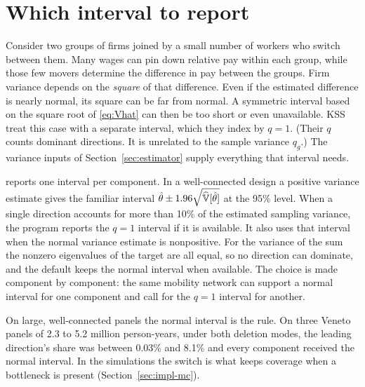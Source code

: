 \section{Which interval to report}\label{sec:q1}\label{sec:impl}

Consider two groups of firms joined by a small number of workers who switch
between them. Many wages can pin down relative pay within each group, while
those few movers determine the difference in pay between the groups. Firm
variance depends on the \emph{square} of that difference. Even if the estimated
difference is nearly normal, its square can be far from normal. A symmetric
interval based on the square root of \eqref{eq:Vhat} can then be too short or
even unavailable. KSS treat this case with a separate interval, which they index by
$q=1$. (Their $q$ counts dominant directions. It is unrelated to the sample variance
$q_g$.) The variance inputs of Section~\ref{sec:estimator} supply everything that
interval needs.

\fevc{} reports one interval per component. In a well-connected design a positive
variance estimate gives the familiar interval
$\hat\theta\pm1.96\sqrt{\widehat{\mathbb{V}}[\hat\theta]}$ at the 95\% level.
When a single direction accounts for more than 10\% of the estimated sampling
variance, the program reports the $q=1$ interval if it is available. It also
uses that interval when the normal variance estimate is nonpositive.
For the variance of the sum the nonzero eigenvalues of the target are all
equal, so no direction can dominate, and the default keeps the normal interval when
available. The choice is made component by component: the same mobility network can
support a normal interval for one component and call for the $q=1$ interval for
another.

On large, well-connected panels the normal interval is the rule. On three Veneto
panels of 2.3 to 5.2 million person-years, under both deletion modes, the leading
direction's share was between 0.03\% and 8.1\% and every component received the
normal interval. In the simulations the switch is what keeps coverage when a
bottleneck is present (Section~\ref{sec:impl-mc}).

